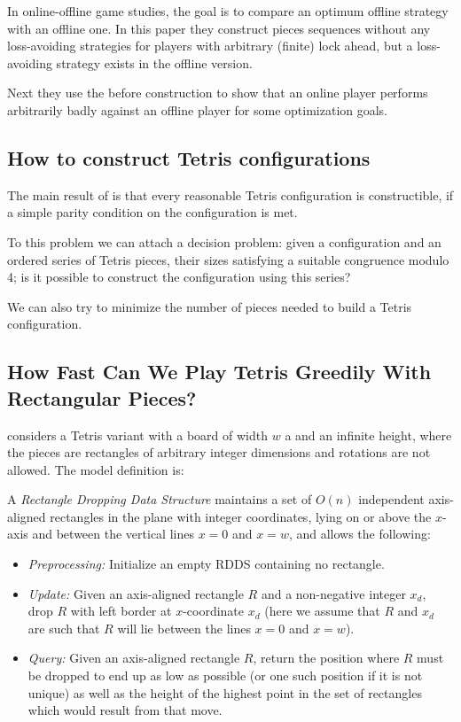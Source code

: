 In online-offline game studies, the goal is to compare an optimum offline strategy with an offline one. In this paper they construct pieces sequences without any loss-avoiding strategies for players with arbitrary (finite) lock ahead, but a loss-avoiding strategy exists in the offline version.

Next they use the before construction to show that an online player performs arbitrarily badly against an offline player for some optimization goals.

\subsection{How to construct Tetris configurations}

The main result of \cite{HTCT} is that every reasonable Tetris configuration is constructible, if a simple parity condition on the configuration is met.

To this problem we can attach a decision problem: given a configuration and an ordered series of Tetris pieces, their sizes satisfying a suitable congruence modulo 4; is it possible to construct the configuration using this series? 

We can also try to minimize the number of pieces needed to build a Tetris configuration.

\subsection{How Fast Can We Play Tetris Greedily With Rectangular Pieces?}

\cite{TWRP} considers a Tetris variant with a board of width $w$ a and an infinite height, where the pieces are rectangles of arbitrary integer dimensions and rotations are not allowed. The model definition is:

\begin{definition}[RDDS]
  A \emph{Rectangle Dropping Data Structure} maintains a set of $O(n)$ independent axis-aligned rectangles in the plane with integer coordinates, lying on or above the $x$-axis and between the vertical lines $x = 0$ and $x = w$, and allows the following:

  \begin{itemize}
    \item \emph{Preprocessing:} Initialize an empty RDDS containing no rectangle.
    \item \emph{Update:} Given an axis-aligned rectangle $R$ and a non-negative integer $x_d$, drop $R$ with left border at $x$-coordinate $x_d$ (here we assume that $R$ and $x_d$ are such that $R$ will lie between the lines $x = 0$ and $x = w$).
    \item \emph{Query:} Given an axis-aligned rectangle $R$, return the position where $R$ must be dropped to end up as low as possible (or one such position if it is not unique) as well as the height of the highest point in the set of rectangles which would result from that move.
  \end{itemize}
\end{definition}

